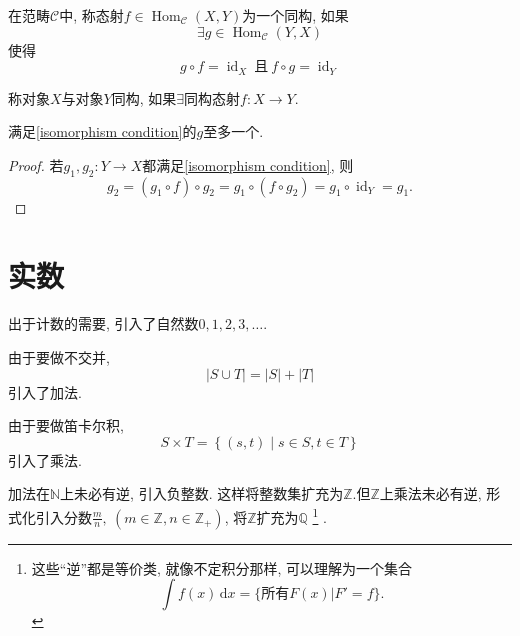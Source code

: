\begin{definition}
    在范畴$\mathcal{C}$中, 称态射$f \in \operatorname{Hom}_{\mathcal{C}}(X,Y)$为一个同构, 如果
    \begin{equation}
      \exists g \in \operatorname{Hom}_{\mathcal{C}}(Y,X)
    \end{equation}
    使得
    \begin{equation}\label{isomorphism condition}
      g \circ f = \operatorname{id}_{X} \ \text{且} \ 
      f \circ g =\operatorname{id}_{Y}
    \end{equation}

    称对象$X$与对象$Y$同构, 如果$\exists \text{同构态射}f \colon X\to Y$.
\end{definition}

\begin{proposition}
    满足\eqref{isomorphism condition}的$g$至多一个.
\end{proposition}

\begin{proof}
    若$g_1,g_2 \colon Y\to X$都满足\eqref{isomorphism condition}, 则
    \begin{equation}
      g_2=(g_1\circ f) \circ g_2 = g_1 \circ (f\circ g_2) = g_1\circ \operatorname{id}_{Y} = g_1.
    \end{equation}
\end{proof}


\section{实数}
出于计数的需要, 引入了自然数$0,1,2,3, \ldots $. 

由于要做不交并, 
\begin{equation}
  \left| S \cup T \right|  = |S| + |T|
\end{equation}
引入了加法.

由于要做笛卡尔积,
\begin{equation}
  S \times T = \left\{ (s,t) \middle| s\in S, t \in T \right\} 
\end{equation}
引入了乘法.

加法在$\mathbb{N}$上未必有逆, 引入负整数. 这样将整数集扩充为$\mathbb{Z}$.但$\mathbb{Z}$上乘法未必有逆, 形式化引入分数$\frac{m}{n} ,\ (m \in \mathbb{Z}, n \in \mathbb{Z}_+)$, 将$\mathbb{Z}$扩充为$\mathbb{Q}$
\footnote{这些``逆''都是等价类, 就像不定积分那样, 可以理解为一个集合
\begin{equation}
  \int f(x) \, \mathrm{d} x = \{\text{所有}F(x)| F' = f\}.
\end{equation}}
.

